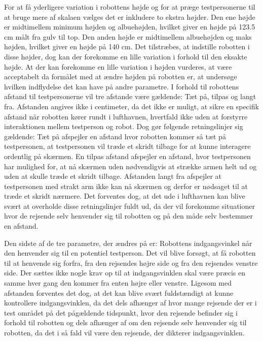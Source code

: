 For at få yderligere variation i robottens højde og for at præge testpersonerne til at bruge mere af skalaen vælges det er inkludere to ekstra højder. Den ene højde er midtimellem minimum højden og albuehøjden, hvilket giver en højde på 123.5 cm målt fra gulv til top. Den anden højde er midtimellem albuehøjden og maks højden, hvilket giver en højde på 140 cm. Det tilstræbes, at indstille robotten i disse højder, dog kan der forekomme en lille variation i forhold til den eksakte højde. At der kan forekomme en lille variation i højden vurderes, at være acceptabelt da formålet med at ændre højden på robotten er, at undersøge hvilken indflydelse det kan have på andre parametre.\blankline           
%
I forhold til robottens afstand til testpersonerne vil tre afstande være gældende: Tæt på, tilpas og langt fra. Afstanden angives ikke i centimeter, da det ikke er muligt, at sikre en specifik afstand når robotten kører rundt i lufthavnen, hvertfald ikke uden at forstyrre interaktionen mellem testperson og robot. Dog gør følgende retningslinjer sig gældende: Tæt på afspejler en afstand hvor robotten kommer så tæt på testpersonen, at testpersonen vil træde et skridt tilbage for at kunne interagere ordentlig på skærmen. En tilpas afstand afspejler en afstand, hvor testpersonen har mulighed for, at nå skærmen uden nødvendigvis at strække armen helt ud og uden at skulle træde et skridt tilbage. Afstanden langt fra afspejler at testpersonen med strakt arm ikke kan nå skærmen og derfor er nødsaget til at træde et skridt nærmere. Det forventes dog, at det ude i lufthavnen kan blive svært at overholde disse retningslinjer fuldt ud, da der vil forekomme situationer hvor de rejsende selv henvender sig til robotten og på den måde selv bestemmer en afstand. 

Den sidste af de tre parametre, der ændres på er: Robottens indgangsvinkel når den henvender sig til en potentiel testperson. Det vil blive forsøgt, at få robotten til at henvende sig forfra, fra den rejsendes højre side og fra den rejsendes venstre side. Der sættes ikke nogle krav op til at indgangsvinklen skal være præcis en samme hver gang den kommer fra enten højre eller venstre. Ligesom med afstanden forventes det dog, at det kan blive svært fuldstændigt at kunne kontrollere indgangsvinklen, da det dels afhænger af hvor mange rejsende der er i test området på det pågældende tidspunkt, hvor den rejsende befinder sig i forhold til robotten og dels afhænger af om den rejsende selv henvender sig til robotten, da det i så fald vil være den rejsende, der dikterer indgangsvinklen.     

